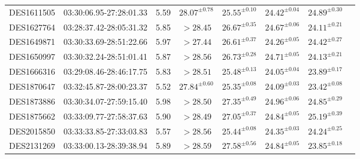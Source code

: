 {\begin{ThreePartTable}
\begin{longtable}{lccccccl}
DES1611505 & 03:30:06.95-27:28:01.33 & 5.59 & $28.07^{ \pm 0.78}$ & $25.55^{ \pm 0.10}$ & $24.42^{ \pm 0.04}$ & $24.89^{ \pm 0.30}$ & \tnote{d} \\
DES1627764 & 03:28:37.42-28:05:31.32 & 5.85 & $> 28.45$ & $26.67^{ \pm 0.35}$ & $24.67^{ \pm 0.06}$ & $24.11^{ \pm 0.21}$ & \tnote{e} \\
DES1649871 & 03:30:33.69-28:51:22.66 & 5.97 & $> 27.44$ & $26.61^{ \pm 0.37}$ & $24.26^{ \pm 0.05}$ & $24.42^{ \pm 0.27}$ & \\
DES1650997 & 03:30:32.24-28:51:01.41 & 5.87 & $> 28.56$ & $26.73^{ \pm 0.28}$ & $24.71^{ \pm 0.05}$ & $24.13^{ \pm 0.21}$ & \\
DES1666316 & 03:29:08.46-28:46:17.75 & 5.83 & $> 28.51$ & $25.48^{ \pm 0.13}$ & $24.05^{ \pm 0.04}$ & $23.89^{ \pm 0.17}$ & \\
DES1870647 & 03:32:45.87-28:00:23.37 & 5.52 & $27.84^{ \pm 0.60}$ & $25.35^{ \pm 0.08}$ & $24.09^{ \pm 0.03}$ & $23.42^{ \pm 0.08}$ & \\
DES1873886 & 03:30:34.07-27:59:15.40 & 5.98 & $> 28.50$ & $27.35^{ \pm 0.49}$ & $24.96^{ \pm 0.06}$ & $24.85^{ \pm 0.29}$ & \\
DES1875662 & 03:33:09.77-27:58:37.63 & 5.90 & $> 28.49$ & $27.05^{ \pm 0.37}$ & $24.84^{ \pm 0.05}$ & $25.19^{ \pm 0.39}$ & \\
DES2015850 & 03:33:33.85-27:33:03.83 & 5.57 & $> 28.56$ & $25.44^{ \pm 0.08}$ & $24.35^{ \pm 0.03}$ & $24.24^{ \pm 0.25}$ & \\
DES2131269 & 03:33:00.13-28:39:38.94 & 5.89 & $> 28.59$ & $27.58^{ \pm 0.56}$ & $24.84^{ \pm 0.05}$ & $23.85^{ \pm 0.18}$ & \\

\end{longtable}
\end{ThreePartTable}

}
